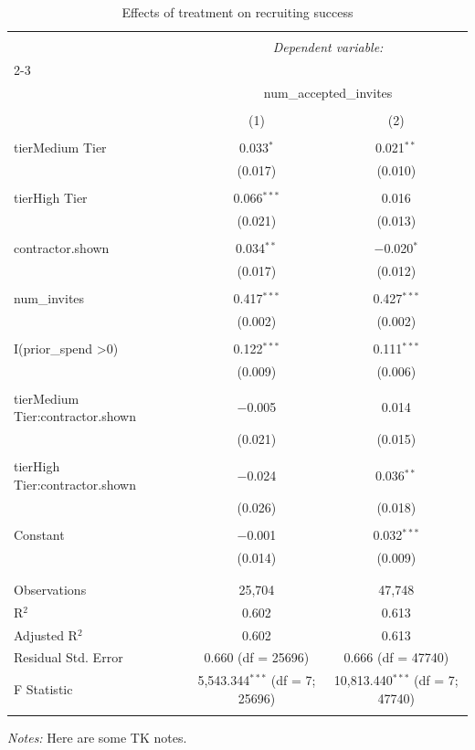 
\begin{table}[!htbp] \centering 
  \caption{Effects of treatment on recruiting success} 
  \label{tab:recruiting_success} 
\begin{tabular}{@{\extracolsep{5pt}}lcc} 
\\[-1.8ex]\hline 
\hline \\[-1.8ex] 
 & \multicolumn{2}{c}{\textit{Dependent variable:}} \\ 
\cline{2-3} 
\\[-1.8ex] & \multicolumn{2}{c}{num\_accepted\_invites} \\ 
\\[-1.8ex] & (1) & (2)\\ 
\hline \\[-1.8ex] 
 tierMedium Tier & 0.033$^{*}$ & 0.021$^{**}$ \\ 
  & (0.017) & (0.010) \\ 
  & & \\ 
 tierHigh Tier & 0.066$^{***}$ & 0.016 \\ 
  & (0.021) & (0.013) \\ 
  & & \\ 
 contractor.shown & 0.034$^{**}$ & $-$0.020$^{*}$ \\ 
  & (0.017) & (0.012) \\ 
  & & \\ 
 num\_invites & 0.417$^{***}$ & 0.427$^{***}$ \\ 
  & (0.002) & (0.002) \\ 
  & & \\ 
 I(prior\_spend \textgreater  0) & 0.122$^{***}$ & 0.111$^{***}$ \\ 
  & (0.009) & (0.006) \\ 
  & & \\ 
 tierMedium Tier:contractor.shown & $-$0.005 & 0.014 \\ 
  & (0.021) & (0.015) \\ 
  & & \\ 
 tierHigh Tier:contractor.shown & $-$0.024 & 0.036$^{**}$ \\ 
  & (0.026) & (0.018) \\ 
  & & \\ 
 Constant & $-$0.001 & 0.032$^{***}$ \\ 
  & (0.014) & (0.009) \\ 
  & & \\ 
\hline \\[-1.8ex] 
Observations & 25,704 & 47,748 \\ 
R$^{2}$ & 0.602 & 0.613 \\ 
Adjusted R$^{2}$ & 0.602 & 0.613 \\ 
Residual Std. Error & 0.660 (df = 25696) & 0.666 (df = 47740) \\ 
F Statistic & 5,543.344$^{***}$ (df = 7; 25696) & 10,813.440$^{***}$ (df = 7; 47740) \\ 
\hline 
\hline \\[-1.8ex] 
\end{tabular}
\emph{Notes:} Here are some TK notes.
\end{table}
